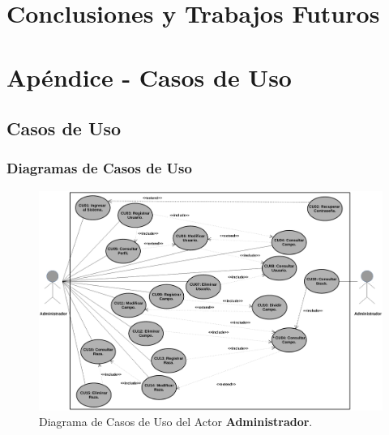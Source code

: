\documentclass[11pt,oneside]{book}
\begin{document}
\chapter{Conclusiones y Trabajos Futuros}

\clearpage
\newpage
\chapter{Apéndice - Casos de Uso}

\section{Casos de Uso}\label{Ap}

\subsection{Diagramas de Casos de Uso}\label{ApDCU}
\begin{figure}[tbhp]
\centerline{\includegraphics[scale=0.5]{figs/capitulo_2_disenio/Diagrama_CU_Administrador.pdf}}
\caption{Diagrama de Casos de Uso del Actor \textbf{Administrador}.}
\label{Ap101}
\end{figure}
\end{document}
